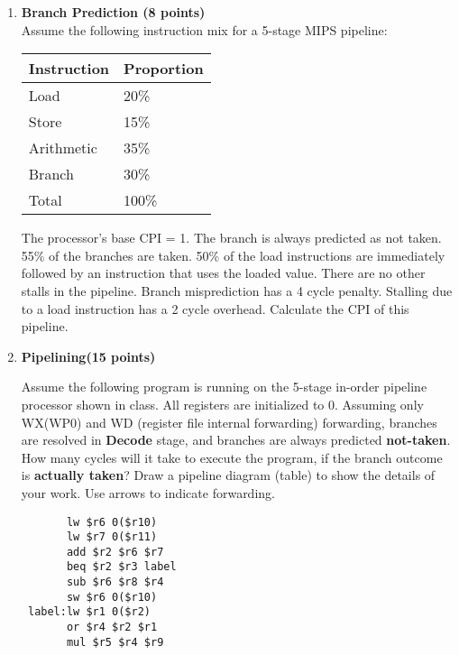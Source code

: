 \documentclass[a4paper,10pt]{article}
\begin{document}
\begin{enumerate}

\item \textbf{Branch Prediction (8 points)}\\
Assume the following instruction mix for a 5-stage MIPS pipeline:
\begin{center}
  \begin{table}[h]
  \centering
\begin{tabular}{ |l|l|}
\hline
Instruction &	Proportion \\ \hline
Load & 20\% \\ \hline
Store & 15\%  \\ \hline 
Arithmetic	& 35\%  \\ \hline
Branch & 30\%  \\\hline
Total & 100\% \\\hline
\end{tabular}
\end{table}
\end{center}
The processor’s base CPI = 1. The branch is always predicted as not taken.  55\% of the branches are taken.  50\% of the load instructions are immediately followed by an instruction that uses the loaded value. There are no other stalls in the pipeline.  Branch misprediction has a 4 cycle penalty. Stalling due to a load instruction has a 2 cycle overhead. Calculate the CPI of this pipeline.


\vspace{\baselineskip}

\item \textbf{Pipelining(15 points)} 

Assume the following program is running on the 5-stage in-order pipeline processor shown in class. All registers are initialized to 0. Assuming only WX(WP0) and WD (register file internal forwarding) forwarding, branches are resolved in \textbf{Decode} stage, and branches are always predicted \textbf{not-taken}. How many cycles will it take to execute the program, if the branch outcome is \textbf{actually taken}? Draw a pipeline diagram (table) to show the details of your work. Use arrows to indicate forwarding.
\begin{verbatim}
       lw $r6 0($r10) 
       lw $r7 0($r11) 
       add $r2 $r6 $r7 
       beq $r2 $r3 label 
       sub $r6 $r8 $r4 
       sw $r6 0($r10) 
 label:lw $r1 0($r2) 
       or $r4 $r2 $r1
       mul $r5 $r4 $r9


\end{verbatim}
\end{enumerate}
\end{document}
